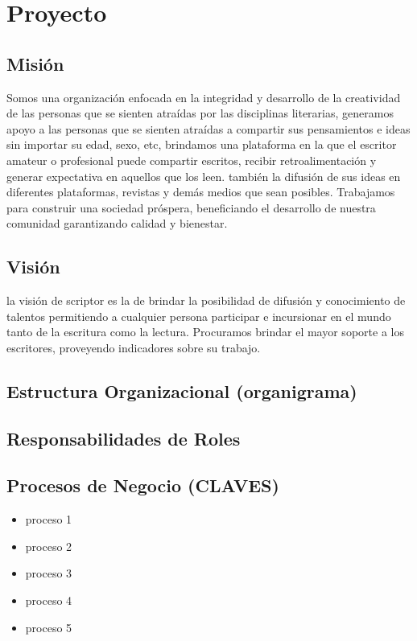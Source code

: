 \chapter{Proyecto}

\section{Misión}
	Somos una organización enfocada en la integridad y desarrollo de la creatividad de las personas que se sienten atraídas por las disciplinas literarias, generamos apoyo a las personas que se sienten atraídas a compartir sus pensamientos e ideas sin importar su edad, sexo, etc, brindamos una plataforma en la que el escritor amateur o profesional puede compartir escritos, recibir retroalimentación y generar expectativa en aquellos que los leen. también la difusión de sus ideas en diferentes plataformas, revistas y demás medios que sean posibles. 
	Trabajamos para construir una sociedad próspera, beneficiando el desarrollo de nuestra comunidad garantizando calidad y bienestar.


\section{Visión}
la visión de scriptor es la de brindar la posibilidad de difusión y conocimiento de talentos permitiendo a cualquier persona participar e incursionar en el mundo tanto de la escritura como la lectura. Procuramos brindar el mayor soporte a los escritores, proveyendo indicadores sobre su trabajo.

\section{Estructura Organizacional (organigrama)}

\section{Responsabilidades de Roles}
\section{Procesos de Negocio (CLAVES)}
\begin{itemize}
	\item proceso 1
	\item proceso 2
	\item proceso 3
	\item proceso 4
	\item proceso 5
\end{itemize}

